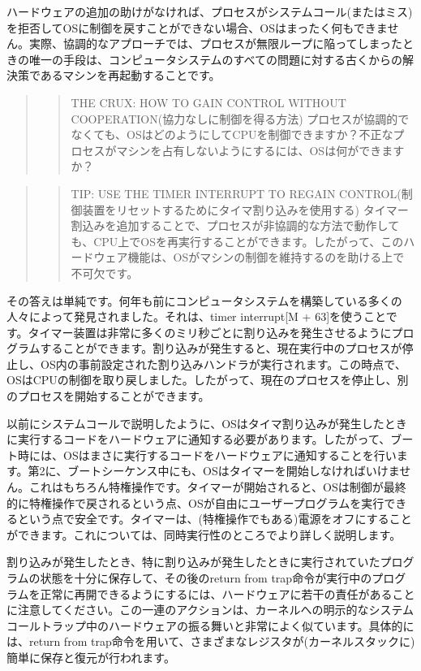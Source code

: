 ハードウェアの追加の助けがなければ、プロセスがシステムコール(またはミス)を拒否してOSに制御を戻すことができない場合、OSはまったく何もできません。実際、協調的なアプローチでは、プロセスが無限ループに陥ってしまったときの唯一の手段は、コンピュータシステムのすべての問題に対する古くからの解決策であるマシンを再起動することです。

\begin{quote}
\begin{quote}
THE CRUX: HOW TO GAIN CONTROL WITHOUT
COOPERATION(協力なしに制御を得る方法)
プロセスが協調的でなくても、OSはどのようにしてCPUを制御できますか？不正なプロセスがマシンを占有しないようにするには、OSは何ができますか？
\end{quote}
\end{quote}

\begin{quote}
\begin{quote}
TIP: USE THE TIMER INTERRUPT TO REGAIN
CONTROL(制御装置をリセットするためにタイマ割り込みを使用する)
タイマー割込みを追加することで、プロセスが非協調的な方法で動作しても、CPU上でOSを再実行することができます。したがって、このハードウェア機能は、OSがマシンの制御を維持するのを助ける上で不可欠です。
\end{quote}
\end{quote}

その答えは単純です。何年も前にコンピュータシステムを構築している多くの人々によって発見されました。それは、timer
interrupt{[}M +
63{]}を使うことです。タイマー装置は非常に多くのミリ秒ごとに割り込みを発生させるようにプログラムすることができます。割り込みが発生すると、現在実行中のプロセスが停止し、OS内の事前設定された割り込みハンドラが実行されます。この時点で、OSはCPUの制御を取り戻しました。したがって、現在のプロセスを停止し、別のプロセスを開始することができます。

以前にシステムコールで説明したように、OSはタイマ割り込みが発生したときに実行するコードをハードウェアに通知する必要があります。したがって、ブート時には、OSはまさに実行するコードをハードウェアに通知することを行います。第2に、ブートシーケンス中にも、OSはタイマーを開始しなければいけません。これはもちろん特権操作です。タイマーが開始されると、OSは制御が最終的に特権操作で戻されるという点、OSが自由にユーザープログラムを実行できるという点で安全です。タイマーは、(特権操作でもある)電源をオフにすることができます。これについては、同時実行性のところでより詳しく説明します。

割り込みが発生したとき、特に割り込みが発生したときに実行されていたプログラムの状態を十分に保存して、その後のreturn
from
trap命令が実行中のプログラムを正常に再開できるようにするには、ハードウェアに若干の責任があることに注意してください。この一連のアクションは、カーネルへの明示的なシステムコールトラップ中のハードウェアの振る舞いと非常によく似ています。具体的には、return
from
trap命令を用いて、さまざまなレジスタが(カーネルスタックに)簡単に保存と復元が行われます。

